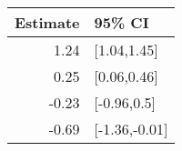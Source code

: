 \begin{tabular}{rl}
  \hline
Estimate & 95\% CI \\ 
  \hline
1.24 & [1.04,1.45] \\ 
  0.25 & [0.06,0.46] \\ 
  -0.23 & [-0.96,0.5] \\ 
  -0.69 & [-1.36,-0.01] \\ 
   \hline
\end{tabular}

